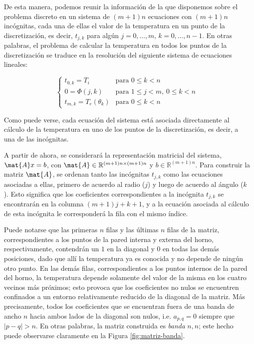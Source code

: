         De esta manera, podemos reunir la información de la que disponemos sobre el problema discreto en un sistema de $(m+1)n$ ecuaciones con $(m+1)n$ incógnitas, cada una de ellas el valor de la temperatura en un punto de la discretización, es decir, $t_{j,k}$ para algún $j = 0, \dots, m$, $k = 0, \dots, n-1$. En otras palabras, el problema de calcular la temperatura en todos los puntos de la discretización se traduce en la resolución del siguiente sistema de ecuaciones lineales:

        \begin{equation} \label{eq:sistema}
            \begin{cases}
                t_{0,k} = T_i
                    & \text{para } 0 \leq k < n \\
                0 = \Phi(j,k)
                    & \text{para } 1 \leq j < m,\ 0 \leq k < n \\
                t_{m,k} = T_e(\theta_k)
                    & \text{para } 0 \leq k < n
            \end{cases}
        \end{equation}

        Como puede verse, cada ecuación del sistema está asociada directamente al cálculo de la temperatura en uno de los puntos de la discretización, es decir, a una de las incógnitas.

        A partir de ahora, se considerará la representación matricial del sistema, $\mat{A}x=b$, con $\mat{A} \in \mathbb{R}^{(m+1)n \times (m+1)n}$ y $b \in \mathbb{R}^{(m+1)n}$. Para construir la matriz $\mat{A}$, se ordenan tanto las incógnitas $t_{j,k}$ como las ecuaciones asociadas a ellas, primero de acuerdo al radio ($j$) y luego de acuerdo al ángulo ($k$). Esto significa que los coeficientes correspondientes a la incógnita $t_{j,k}$ se encontrarán en la columna $(m+1)j + k + 1$, y a la ecuación asociada al cálculo de esta incógnita le corresponderá la fila con el mismo índice.

        Puede notarse que las primeras $n$ filas y las últimas $n$ filas de la matriz, correspondientes a los puntos de la pared interna y externa del horno, respectivamente, contendrán un $1$ en la diagonal y $0$ en todas las demás posiciones, dado que allí la temperatura ya es conocida y no depende de ningún otro punto. En las demás filas, correspondientes a los puntos internos de la pared del horno, la temperatura depende solamente del valor de la misma en los cuatro vecinos más próximos; esto provoca que los coeficientes no nulos se encuentren confinados a un entorno relativamente reducido de la diagonal de la matriz. Más precisamente, todos los coeficientes que se encuentran fuera de una banda de ancho $n$ hacia ambos lados de la diagonal son nulos, i.e. $a_{p,q} = 0$ siempre que $\vert p - q \vert > n$. En otras palabras, la matriz construida es \emph{banda} $n, n$; este hecho puede observarse claramente en la Figura \ref{fig:matriz-banda}.

